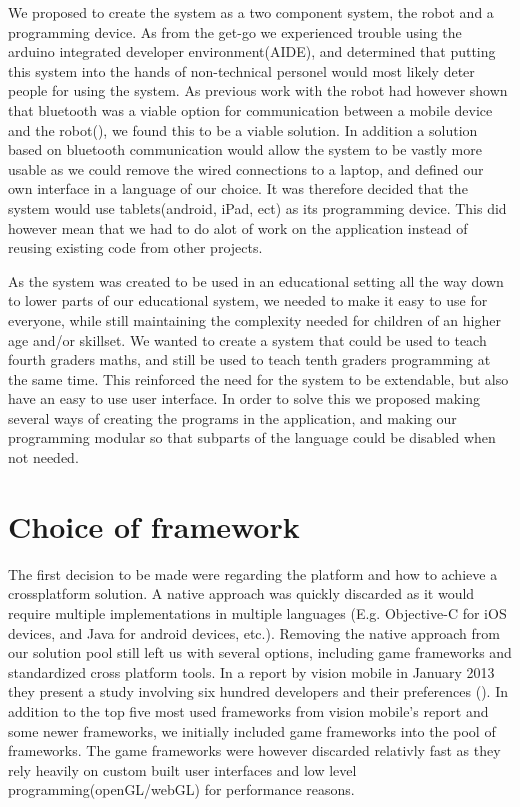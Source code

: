 \bigskip\noindent
We proposed to create the system as a two component system, the \chirp robot and a programming device. 
As from the get-go we experienced trouble using the arduino integrated developer environment(AIDE), and determined that putting this system into the hands of non-technical personel would most likely deter people for using the system. 
As previous work with the robot had however shown that bluetooth was a viable option for communication between a mobile device and the robot(\cite{chrip2013ResearcherNight}), we found this to be a viable solution.
In addition a solution based on bluetooth communication would allow the system to be vastly more usable as we could remove the wired connections to a laptop, and defined our own interface in a language of our choice.
It was therefore decided that the system would use tablets(android, iPad, ect) as its programming device. This did however mean that we had to do alot of work on the application instead of reusing existing code from other projects. 

\bigskip\noindent
As the system was created to be used in an educational setting all the way down to lower parts of our educational system, 
we needed to make it easy to use for everyone, while still maintaining the complexity needed for children of an higher age and/or skillset. 
We wanted to create a system that could be used to teach fourth graders maths, and still be used to teach tenth graders programming at the same time. 
This reinforced the need for the system to be extendable, but also have an easy to use user interface. 
In order to solve this we proposed making several ways of creating the programs in the application, and making our programming modular so that subparts of the language could be disabled when not needed.
	
\section{Choice of framework}
	The first decision to be made were regarding the platform and how to achieve a crossplatform solution. 
	A native approach was quickly discarded as it would require multiple implementations in multiple languages (E.g. Objective-C for iOS devices, and Java for android devices, etc.). 
	Removing the native approach from our solution pool still left us with several options, including game frameworks and standardized cross platform tools.
	In a report by vision mobile in January 2013 they present a study involving six hundred developers and their preferences (\cite{developerCPT}). 
	In addition to the top five most used frameworks from vision mobile's report and some newer frameworks, we initially included game frameworks into the pool of frameworks. 
	The game frameworks were however discarded relativly fast as they rely heavily on custom built user interfaces and low level programming(openGL/webGL) for performance reasons.
	
